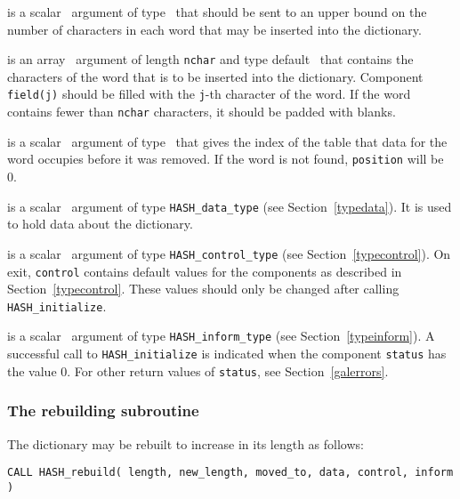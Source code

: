 \documentclass{galahad}
\newcommand{\packagename}{HASH}
\begin{document}
\vspace*{-2mm}
\begin{description}

 is a scalar \intentin\ argument of type \integer\ that
should be sent to an upper bound on the number of characters in each
word that may be inserted into the dictionary.

 is an array \intentin\ argument of length {\tt nchar} and 
type default \character\ that contains the characters of the word that 
is to be inserted into the dictionary.  
Component {\tt field(j)} should be filled with the {\tt j}-th 
character of the word. If the word contains fewer than {\tt nchar} characters,
it should be padded with blanks.

 is a scalar \intentout\ argument of type \integer\ that
gives the index of the table that data for the word occupies before it was
removed. If the word is not found, {\tt position} will be 0.

 is a scalar \intentinout\ argument of type
{\tt \packagename\_data\_type}
(see Section~\ref{typedata}). It is used to hold data about the dictionary.

 is a scalar \intentin\ argument of type
{\tt \packagename\_control\_type}
(see Section~\ref{typecontrol}).
On exit, {\tt control} contains default values for the components as
described in Section~\ref{typecontrol}.
These values should only be changed after calling
{\tt \packagename\_initialize}.

 is a scalar \intentinout\ argument of type
{\tt \packagename\_inform\_type}
(see Section~\ref{typeinform}). A successful call to
{\tt \packagename\_initialize}
is indicated when the  component {\tt status} has the value 0.
For other return values of {\tt status}, see Section~\ref{galerrors}.

\end{description}


\subsubsection{The rebuilding subroutine}\label{subrebuild}
The dictionary may be rebuilt to increase in its length as follows:
\vspace*{1mm}

\hspace{8mm}
{\tt CALL \packagename\_rebuild( length, new\_length, moved\_to, data, control, inform )}
\end{document}
